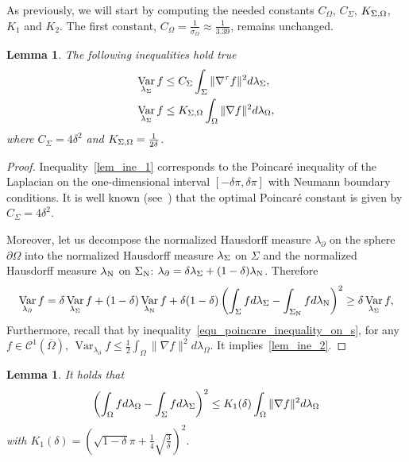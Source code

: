 \documentclass[a4paper]{article}
\newtheorem{lemma}[theorem]{Lemma}
\theoremstyle{definition}
\DeclareMathOperator{\Var}{Var}
\numberwithin{equation}{section}
\begin{document}
As previously, we will start by computing the needed constants $C_\Omega$, $C_\Sigma$, $K_{\Sigma,\Omega}$, $K_1$ and $K_2$. 
The first constant, $C_\Omega=\frac{1}{\sigma_{\Omega}}\approx \frac{1}{3.39}$, remains unchanged.
\begin{lemma} The following inequalities hold true
\begin{align}
\label{lem_ine_1}
\Var_{\mus} f &\leq C_\Sigma \int_{\Sigma} \|\bnabla f\|^2 d \mus, \\
\Var_{\mus} f &\leq \Cint \int_{\Omega} \|\nabla f\|^2 d\lambda_\Omega,
\label{lem_ine_2}
\end{align}
where $C_\Sigma=4\delta^2$ and $K_{\Sigma,\Omega}=\frac{1}{2\delta}$. 
\end{lemma}


\begin{proof}
Inequality~\eqref{lem_ine_1} corresponds to the Poincaré inequality of the Laplacian on the one-dimensional interval $[-\delta \pi, \delta \pi]$ with Neumann boundary conditions. It is well known (see~\cite[Prop. 4.5.5]{Bakry:2014}) that the optimal Poincaré constant is given by $C_\Sigma=4\delta^2$.

Moreover, let us decompose the normalized Hausdorff measure $\lambda_\partial$ on the sphere $\partial \Omega$ into the normalized Hausdorff measure $\lambda_\Sigma$ on $\Sigma$  and the normalized Hausdorff measure $\lambda_{\operatorname{N}}$ on $\Sigma_{\operatorname{N}}$: $\lambda_\partial = \delta \lambda_\Sigma + (1-\delta) \lambda_{\operatorname{N}}$. 
Therefore
\begin{align*}
\Var_{\lambda_{\partial }} f = \delta\Var_{\mus} f + (1-\delta)\Var_{\mun} f
  +  \delta(1-\delta) \left( \int_{\Sigma} f d\mus- \int_{\neumann} f d\mun \right)^2
  \geq \delta\Var_{\mus} f,
\end{align*}
Furthermore, recall that by inequality~\eqref{equ_poincare_inequality_on_s}, for any $f \in \mathcal C^1(\overline \Omega)$, $
\Var_{\lambda_{\partial }} f\leq  \frac{1}{ 2 }\int_{ \Omega }   \|\nabla f\|^2 d\lambda_\Omega$. 
It implies~\eqref{lem_ine_2}.
\end{proof}



\begin{lemma}
It holds that 
\begin{align*}
\left( \int_\Omega f d \lambda_\Omega - \int_{\Sigma} f d \lambda_\Sigma \right)^2
\leq K_1(\delta) \int_\Omega \| \nabla f \|^2 d\lambda_\Omega
\end{align*}
with  $K_1(\delta)= \left( \sqrt{1-\delta}\pi + \frac{1}{4}\sqrt{\frac{3}{\delta}} \right)^2$.
\end{lemma}
\end{document}

